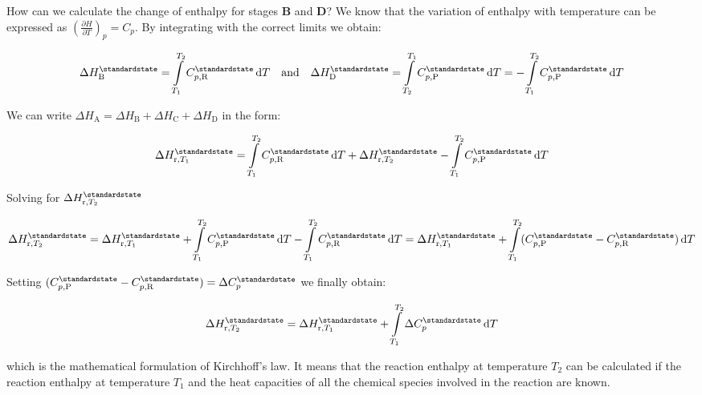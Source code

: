 \documentclass[12pt,a4paper]{report}
\newcommand*\diff{\mathop{}\!\mathrm{d}}
\newif\ifstudents
\begin{document}
   How can we calculate the change of enthalpy for stages \textbf{B} and \textbf{D}? We know that the variation of enthalpy with temperature can be expressed as $\left(\frac{\partial H}{\partial T}\right)_{p}=C_{p}$.  By integrating with the correct limits we obtain:
   \ifstudents \hideit[2]{ \fi
   \begin{align*}
   \Delta H^{\standardstate}_{\mathrm{B}}=\int\limits_{T_{1}}^{T_{2}}C^{\standardstate}_{p,\mathrm{R}}\diff T &&\mathrm{and}&& \Delta H^{\standardstate}_{\mathrm{D}}=\int\limits_{T_{2}}^{T_{1}}C^{\standardstate}_{p,\mathrm{P}}\diff T = -\int\limits_{T_{1}}^{T_{2}}C^{\standardstate}_{p,\mathrm{P}}\diff T
   \end{align*}
   \ifstudents } \fi
   We can write $\Delta H_{\mathrm{A}} = \Delta H_{\mathrm{B}}+\Delta H_{\mathrm{C}}+\Delta H_{\mathrm{D}}$ in the form:
   \ifstudents \hideit[2]{ \fi
   \begin{equation*}
   \Delta H^{\standardstate}_{\mathrm{r},T_{1}}=\int\limits_{T_{1}}^{T_{2}} C^{\standardstate}_{p,\mathrm{R}}\diff T +\Delta H^{\standardstate}_{\mathrm{r},T_{2}} -\int\limits_{T_{1}}^{T_{2}} C^{\standardstate}_{p,\mathrm{P}}\diff T
   \end{equation*}
   \ifstudents } \fi
   Solving for $\Delta H^{\standardstate}_{\mathrm{r},T_{2}}$
   \ifstudents \hideit[2]{ \fi
   \begin{equation*}
   \Delta H^{\standardstate}_{\mathrm{r},T_{2}}=\Delta H^{\standardstate}_{\mathrm{r},T_{1}} +\int\limits_{T_{1}}^{T_{2}} C^{\standardstate}_{p,\mathrm{P}}\diff T -  \int\limits_{T_{1}}^{T_{2}} C^{\standardstate}_{p,\mathrm{R}}\diff T =\Delta H^{\standardstate}_{\mathrm{r},T_{1}} +\int\limits_{T_{1}}^{T_{2}} (C^{\standardstate}_{p,\mathrm{P}}- C^{\standardstate}_{p,\mathrm{R}})\diff T 
   \end{equation*}
   \ifstudents } \fi
   Setting $(C^{\standardstate}_{p,\mathrm{P}}- C^{\standardstate}_{p,\mathrm{R}}) = \Delta C^{\standardstate}_{p}$ we finally obtain:
   \ifstudents \hideit[2]{ \fi
   \begin{equation*}
   \Delta H^{\standardstate}_{\mathrm{r},T_{2}} = \Delta H^{\standardstate}_{\mathrm{r},T_{1}} +\int\limits_{T_{1}}^{T_{2}} \Delta C^{\standardstate}_{p}\diff T 
   \end{equation*}
   \ifstudents } \fi
   which is the mathematical formulation of Kirchhoff's law. It means that the reaction enthalpy at temperature $T_{2}$ can be calculated if the reaction enthalpy at temperature $T_{1}$ and the heat capacities of all the chemical species involved in the reaction are known.    
\end{document}
